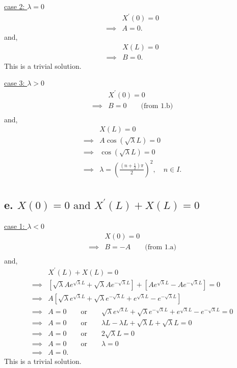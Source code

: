 \documentclass{article}
\begin{document}
\underline{case 2: $\lambda = 0$}
\begin{align*}
  &X^{\prime}(0) = 0 \\
  \implies& A = 0.
\end{align*}
and,
\begin{align*}
  &X(L) = 0 \\
  \implies& B = 0.
\end{align*}
This is a trivial solution.
\newline

\underline{case 3: $\lambda > 0$}
\begin{align*}
  &X^{\prime}(0) = 0 \\
  \implies& B = 0 \qquad \text{(from 1.b)} \\
\end{align*}
and,
\begin{align*}
  &X(L) = 0 \\
  \implies& A \cos(\sqrt{\lambda} L) = 0 \\
  \implies& \cos(\sqrt{\lambda} L) = 0 \\
  \implies& \lambda = (\frac{(n + \frac{1}{2}) \pi}{2})^2, \quad n \in I.\\
\end{align*}

\subsection*{e. \underline{$X(0) = 0 \text{ and } X^{\prime}(L) + X(L) = 0$}}
\underline{case 1: $\lambda < 0$}
\begin{align*}
  &X(0) = 0 \\
  \implies& B = - A \qquad \text{(from 1.a)} \\
\end{align*}
and,
\begin{align*}
  &X^{\prime}(L) + X(L) = 0 \\
  \implies& [\sqrt{\lambda} A e^{\sqrt{\lambda} L} + \sqrt{\lambda} A e^{-\sqrt{\lambda} L}] 
  + 
  [A e^{\sqrt{\lambda} L} - A e^{-\sqrt{\lambda} L}]
  = 0 \\
  \implies& A [\sqrt{\lambda} e^{\sqrt{\lambda} L} + \sqrt{\lambda} e^{-\sqrt{\lambda} L} 
  +
  e^{\sqrt{\lambda} L} - e^{-\sqrt{\lambda} L}] \\
  \implies& A = 0 \qquad \text{or} \qquad 
  \sqrt{\lambda} e^{\sqrt{\lambda} L} + \sqrt{\lambda} e^{-\sqrt{\lambda} L} 
  +
  e^{\sqrt{\lambda} L} - e^{-\sqrt{\lambda} L} = 0 \\
  \implies& A = 0 \qquad \text{or} \qquad 
  \lambda L - \lambda L
  +
  \sqrt{\lambda} L + \sqrt{\lambda} L = 0 \\
  \implies& A = 0 \qquad \text{or} \qquad 
  2\sqrt{\lambda} L = 0 \\
  \implies&A = 0 \qquad \text{or} \qquad 
  \lambda = 0 \\
  \implies& A = 0.
\end{align*}
This is a trivial solution.
\newline
\end{document}
